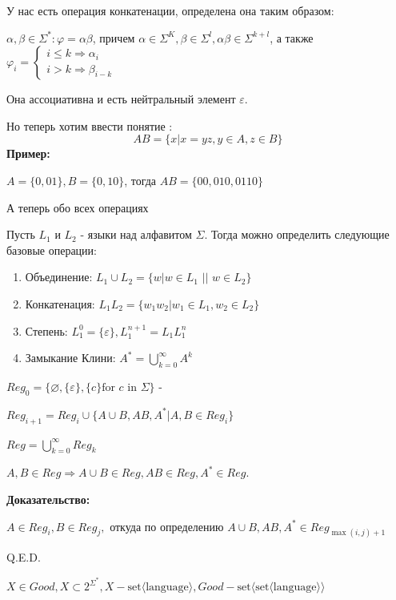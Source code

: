 У нас есть операция конкатенации, определена она таким образом:

$\alpha, \beta \in \Sigma^*: \varphi = \alpha \beta$, причем $\alpha \in \Sigma^K, \beta \in \Sigma^l, \alpha\beta \in \Sigma^{k+l}$, а также $\varphi_i =\begin{cases}
    i \leq k \Rightarrow \alpha_i\\
    i > k \Rightarrow \beta_{i-k}
\end{cases}
$

Она ассоциативна и есть нейтральный элемент $\varepsilon$.

Но теперь хотим ввести понятие :
$$AB = \{x | x = yz, y \in A,z \in B\}$$
\textbf{Пример:}

$A = \{0,01\}, B = \{0,10\}$, тогда $AB = \{00,010,0110\}$

А теперь обо всех операциях 

Пусть $L_1$ и $L_2$ - языки над алфавитом $\Sigma$. Тогда можно определить следующие базовые операции:
\begin{enumerate}
    \item Объединение: $L_1 \cup L_2 = \{w | w \in L_1\,\,  ||\,\, w \in L_2\}$
    \item  Конкатенация: $L_1 L_2 = \{w_1 w_2 | w_1 \in L_1, w_2 \in L_2\}$

    \item Степень: $L_1^0 = \{\varepsilon\},L_1^{n+1}=L_1L_1^n$

    \item Замыкание Клини: $A^* = \bigcup\limits_{k=0}^\infty A^k$
\end{enumerate}



$Reg_0 =\{\varnothing, \{\varepsilon\}, \{c\} \text{for $c$ in $\Sigma$}\}$ - 

$Reg_{i+1} = Reg_i \cup \{A\cup B,AB,A^*| A,B \in Reg_i\}$

 $Reg = \bigcup_{k=0}^\infty Reg_k$


$A,B \in Reg \Rightarrow A \cup B \in Reg, AB \in Reg, A^* \in Reg$.

\textbf{Доказательство:}

$A \in Reg_i, B \in Reg_j,$ откуда по определению $A \cup B, AB, A^* \in Reg_{\max(i,j)+1}$

\hfill Q.E.D.

$X\in Good, X \subset 2^{\Sigma^*}, X - \text{set$\langle$language$\rangle$}, Good  -\text{set$\langle$set$\langle $language$\rangle\rangle$}$ 

